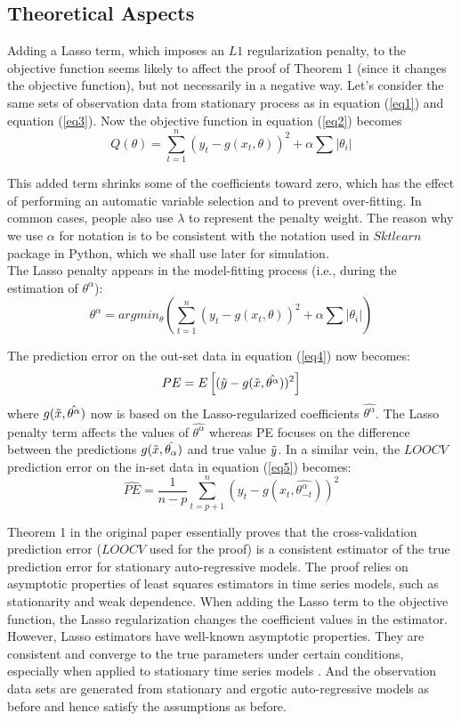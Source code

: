 \documentclass[12pt, oneside]{amsart}
\theoremstyle{definition}
\theoremstyle{remark}
\numberwithin{equation}{section}
\begin{document}
\subsection{Theoretical Aspects}
Adding a Lasso term, which imposes an $L1$ regularization penalty, to the objective function seems likely to affect the proof of Theorem 1 (since it changes the objective function), but not necessarily in a negative way. Let's consider the same sets of observation data from stationary process as in equation (\ref{eq1}) and equation (\ref{eq3}). Now the objective function in equation (\ref{eq2}) becomes 
$$Q(\theta) = \sum^n_{t=1} (y_t - g(x_t, \theta))^2 + \alpha \sum |\theta_i|
$$ 

This added term shrinks some of the coefficients toward zero, which has the effect of performing an automatic variable selection and to prevent over-fitting. In common cases, people also use $\lambda$ to represent the penalty weight. The reason why we use $\alpha$ for notation is to be consistent with the notation used in $Sktlearn$ package in Python, which we shall use later for simulation.\\

The Lasso penalty appears in the model-fitting process (i.e., during the estimation of $\theta^\alpha$):
$$\theta^\alpha = arg min_\theta \left( \sum^n_{t=1} (y_t - g(x_t, \theta))^2 + \alpha \sum |\theta_i| \right)$$

The prediction error on the out-set data in equation (\ref{eq4}) now becomes: 
\begin{equation}\label{eq7}
    PE = E\left[(\Tilde{y} - g(\Tilde{x},\hat{\theta^\alpha}))^2\right]
\end{equation}
where $g(\Tilde{x},\hat{\theta^\alpha})$ now is based on the Lasso-regularized coefficients $\hat{\theta^\alpha}$. The Lasso penalty term affects the values of $\hat{\theta^\alpha}$ whereas PE focuses on the difference between the predictions $g(\Tilde{x},\hat{\theta_\alpha})$ and true value $\Tilde{y}$. In a similar vein, the $LOOCV$ prediction error on the in-set data in equation (\ref{eq5}) becomes: 
\begin{equation}\label{eq8}
\hat{PE} = \frac{1}{n-p} \sum_{t=p+1}^n \left( y_t - g(x_t,\hat{\theta^\alpha_{-t}}) \right)^2
\end{equation}

Theorem 1 in the original paper essentially proves that the cross-validation prediction error ($LOOCV$ used for the proof) is a consistent estimator of the true prediction error for stationary auto-regressive models. The proof relies on asymptotic properties of least squares estimators in time series models, such as stationarity and weak dependence. When adding the Lasso term to the objective function, the Lasso regularization changes the coefficient values in the estimator. However, Lasso estimators have well-known asymptotic properties. They are consistent and converge to the true parameters under certain conditions, especially when applied to stationary time series models \citep{Tibshirani}. And the observation data sets are generated from stationary and ergotic auto-regressive models as before and hence satisfy the assumptions as before.\\
\end{document}
